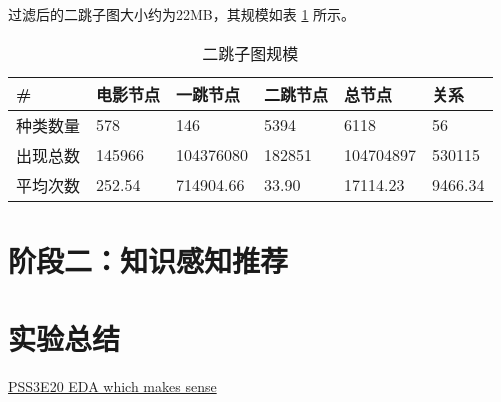 \documentclass{ctexart}
\begin{document}
\begin{sloppypar}
过滤后的二跳子图大小约为22MB，其规模如表 \ref{tab:1} 所示。

\begin{table}[h]
      \centering
      \caption{二跳子图规模\label{tab:1}}
      \begin{tabular}{llllll}
            \hline
            \#                & 电影节点    & 一跳节点    & 二跳节点  & 总节点          & 关系          \\ \hline
            种类数量          & 578         & 146         & 5394      & 6118           &  56          \\
            出现总数          & 145966      & 104376080   &182851     & 104704897      & 530115        \\
            平均次数          & 252.54      & 714904.66   & 33.90      & 17114.23      & 9466.34        \\
            \hline
      \end{tabular}
\end{table}

\section{阶段二：知识感知推荐}

\section{实验总结}


\begin{thebibliography}{100}
      \href{https://www.kaggle.com/code/ambrosm/pss3e20-eda-which-makes-sense}{PSS3E20 EDA which makes sense}
\end{thebibliography}

\end{sloppypar}
\end{document}
